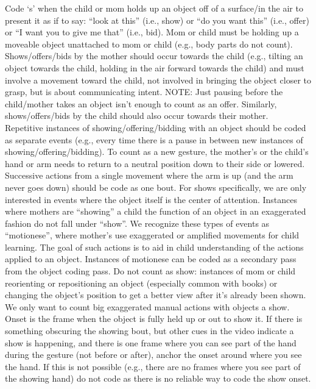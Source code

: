 \documentclass[
  12pt,
]{book}
\begin{document}
Code `s' when the child or mom holds up an object off of a surface/in the air to present it as if to say: ``look at this'' (i.e., show) or ``do you want this'' (i.e., offer) or ``I want you to give me that'' (i.e., bid). Mom or child must be holding up a moveable object unattached to mom or child (e.g., body parts do not count). Shows/offers/bids by the mother should occur towards the child (e.g., tilting an object towards the child, holding in the air forward towards the child) and must involve a movement toward the child, not involved in bringing the object closer to grasp, but is about communicating intent. NOTE: Just pausing before the child/mother takes an object isn't enough to count as an offer. Similarly, shows/offers/bids by the child should also occur towards their mother.\\
Repetitive instances of showing/offering/bidding with an object should be coded as separate events (e.g., every time there is a pause in between new instances of showing/offering/bidding). To count as a new gesture, the mother's or the child's hand or arm needs to return to a neutral position down to their side or lowered. Successive actions from a single movement where the arm is up (and the arm never goes down) should be code as one bout.
For shows specifically, we are only interested in events where the object itself is the center of attention. Instances where mothers are ``showing'' a child the function of an object in an exaggerated fashion do not fall under ``show''. We recognize these types of events as ``motionese'', where mother's use exaggerated or amplified movements for child learning. The goal of such actions is to aid in child understanding of the actions applied to an object. Instances of motionese can be coded as a secondary pass from the object coding pass.
Do not count as show: instances of mom or child reorienting or repositioning an object (especially common with books) or changing the object's position to get a better view after it's already been shown. We only want to count big exaggerated manual actions with objects a show.
Onset is the frame when the object is fully held up or out to show it. If there is something obscuring the showing bout, but other cues in the video indicate a show is happening, and there is one frame where you can see part of the hand during the gesture (not before or after), anchor the onset around where you see the hand. If this is not possible (e.g., there are no frames where you see part of the showing hand) do not code as there is no reliable way to code the show onset.
\end{document}
